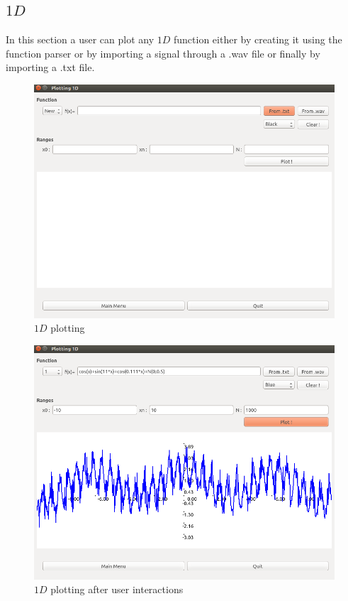 \documentclass[a4paper]{report}
\begin{document}
\subsection{$1D$}
In this section a user can plot any $1D$ function either by creating it using the function parser or by importing a signal through a .wav file or finally by importing a .txt file.
\begin{figure}[H]
\begin{center}
\includegraphics[scale=0.45]{plotting_1D_nude.png}\caption{$1D$ plotting }
\end{center}
\end{figure}


\begin{figure}[H]
\begin{center}
\includegraphics[scale=0.45]{plotting_1D_example.png}\caption{$1D$ plotting after user interactions}
\end{center}
\end{figure}
\end{document}
